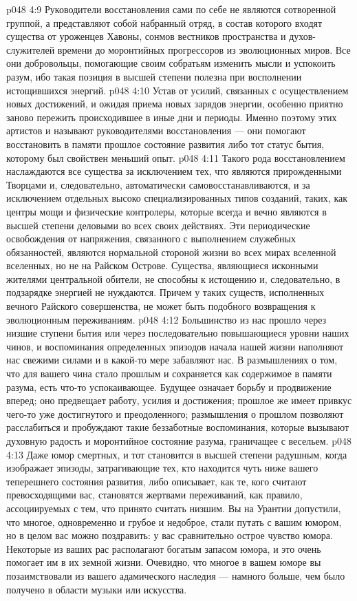 \vs p048 4:9 Руководители восстановления сами по себе не являются сотворенной группой, а представляют собой набранный отряд, в состав которого входят существа от уроженцев Хавоны, сонмов вестников пространства и духов\hyp{}служителей времени до моронтийных прогрессоров из эволюционных миров. Все они добровольцы, помогающие своим собратьям изменить мысли и успокоить разум, ибо такая позиция в высшей степени полезна при восполнении истощившихся энергий.
\vs p048 4:10 \pc Устав от усилий, связанных с осуществлением новых достижений, и ожидая приема новых зарядов энергии, особенно приятно заново пережить происходившее в иные дни и периоды.  Именно поэтому этих артистов и называют руководителями восстановления --- они помогают восстановить в памяти прошлое состояние развития либо тот статус бытия, которому был свойствен меньший опыт.
\vs p048 4:11 Такого рода восстановлением наслаждаются все существа за исключением тех, что являются прирожденными Творцами и, следовательно, автоматически самовосстанавливаются, и за исключением отдельных высоко специализированных типов созданий, таких, как центры мощи и физические контролеры, которые всегда и вечно являются в высшей степени деловыми во всех своих действиях. Эти периодические освобождения от напряжения, связанного с выполнением служебных обязанностей, являются нормальной стороной жизни во всех мирах вселенной вселенных, но не на Райском Острове. Существа, являющиеся исконными жителями центральной обители, не способны к истощению и, следовательно, в подзарядке энергией не нуждаются. Причем у таких существ, исполненных вечного Райского совершенства, не может быть подобного возвращения к эволюционным переживаниям.
\vs p048 4:12 Большинство из нас прошло через низшие ступени бытия или через последовательно повышающиеся уровни наших чинов, и воспоминания определенных эпизодов начала нашей жизни наполняют нас свежими силами и в какой\hyp{}то мере забавляют нас. В размышлениях о том, что для вашего чина стало прошлым и сохраняется как содержимое в памяти разума, есть что\hyp{}то успокаивающее. Будущее означает борьбу и продвижение вперед; оно предвещает работу, усилия и достижения; прошлое же имеет привкус чего\hyp{}то уже достигнутого и преодоленного; размышления о прошлом позволяют расслабиться и пробуждают такие беззаботные воспоминания, которые вызывают духовную радость и моронтийное состояние разума, граничащее с весельем.
\vs p048 4:13 Даже юмор смертных, и тот становится в высшей степени радушным, когда изображает эпизоды, затрагивающие тех, кто находится чуть ниже вашего теперешнего состояния развития, либо описывает, как те, кого считают превосходящими вас, становятся жертвами переживаний, как правило, ассоциируемых с тем, что принято считать низшим. Вы на Урантии допустили, что многое, одновременно и грубое и недоброе, стали путать с вашим юмором, но в целом вас можно поздравить: у вас сравнительно острое чувство юмора. Некоторые из ваших рас располагают богатым запасом юмора, и это очень помогает им в их земной жизни. Очевидно, что многое в вашем юморе вы позаимствовали из вашего адамического наследия --- намного больше, чем было получено в области музыки или искусства.
